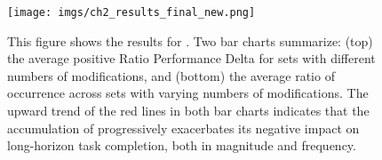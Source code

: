 \begin{figure}[ht]
    \centering
    \texttt{[image: imgs/ch2\_results\_final\_new.png]} 
    \caption{This figure shows the results for \bmb. Two bar charts summarize: (top) the average positive Ratio Performance Delta for sets with different numbers of modifications, and (bottom) the average ratio of \pb occurrence across sets with varying numbers of modifications. The upward trend of the red lines in both bar charts indicates that the accumulation of \pb progressively exacerbates its negative impact on long-horizon task completion, both in magnitude and frequency.}
    \vspace{-0.5em}
    \label{fig:ch2_results}
\end{figure}





